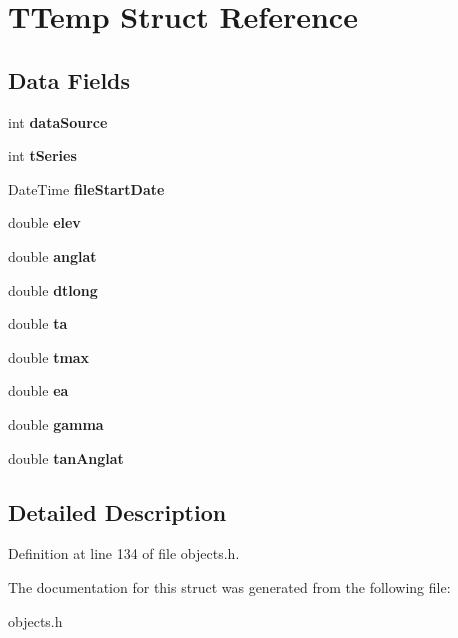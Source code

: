 \hypertarget{struct_t_temp}{}\section{T\+Temp Struct Reference}
\label{struct_t_temp}
\subsection*{Data Fields}
\begin{DoxyCompactItemize}
\item 
\mbox{\label{struct_t_temp_a8c6e143881a82092996a7c55e51b2c2b}} 
int {\bfseries data\+Source}
\item 
\mbox{\label{struct_t_temp_a3de729b1c96053f3bd7fa21323bbb78c}} 
int {\bfseries t\+Series}
\item 
\mbox{\label{struct_t_temp_a27208754a628429a893203daef438c57}} 
Date\+Time {\bfseries file\+Start\+Date}
\item 
\mbox{\label{struct_t_temp_a8dda1d2ff84ad30e50a542bfd0cac21e}} 
double {\bfseries elev}
\item 
\mbox{\label{struct_t_temp_a737db4ca28ddc3fc0f5035d40e1c8cf3}} 
double {\bfseries anglat}
\item 
\mbox{\label{struct_t_temp_ae5a54d2f6262b164971b2eafa7b050c7}} 
double {\bfseries dtlong}
\item 
\mbox{\label{struct_t_temp_adca44f25fa586684a49891f7d5b58ca1}} 
double {\bfseries ta}
\item 
\mbox{\label{struct_t_temp_abb35e1061ebe407930e0f8325712d6fc}} 
double {\bfseries tmax}
\item 
\mbox{\label{struct_t_temp_a7585960394365065c786aae471781bec}} 
double {\bfseries ea}
\item 
\mbox{\label{struct_t_temp_a72f9e01745b3a8203067ab84aefc9aea}} 
double {\bfseries gamma}
\item 
\mbox{\label{struct_t_temp_a821094b93fb5a0880a9a63a92537ce6c}} 
double {\bfseries tan\+Anglat}
\end{DoxyCompactItemize}


\subsection{Detailed Description}


Definition at line 134 of file objects.\+h.



The documentation for this struct was generated from the following file\+:\begin{DoxyCompactItemize}
\item 
objects.\+h\end{DoxyCompactItemize}
